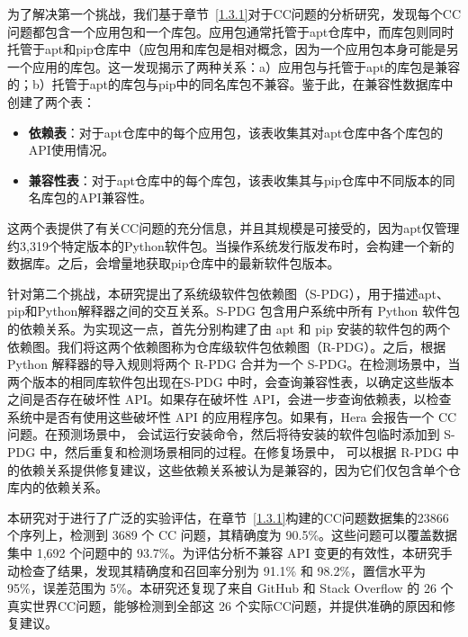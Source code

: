 为了解决第一个挑战，我们基于章节~\ref{1.3.1}对于CC问题的分析研究，发现每个CC问题都包含一个应用包和一个库包。应用包通常托管于apt仓库中，而库包则同时托管于apt和pip仓库中（应包用和库包是相对概念，因为一个应用包本身可能是另一个应用的库包。这一发现揭示了两种关系：a）应用包与托管于apt的库包是兼容的；b）托管于apt的库包与pip中的同名库包不兼容。鉴于此，\tool{}在兼容性数据库中创建了两个表：
\begin{itemize}
	\item \textbf{依赖表}：对于apt仓库中的每个应用包，该表收集其对apt仓库中各个库包的API使用情况。
	\item\textbf{兼容性表}：对于apt仓库中的每个库包，该表收集其与pip仓库中不同版本的同名库包的API兼容性。
\end{itemize}
这两个表提供了有关CC问题的充分信息，并且其规模是可接受的，因为apt仅管理约3,319个特定版本的Python软件包。当操作系统发行版发布时，\tool{}会构建一个新的数据库。之后，\tool{}会增量地获取pip仓库中的最新软件包版本。

针对第二个挑战，本研究提出了系统级软件包依赖图（S-PDG），用于描述apt、pip和Python解释器之间的交互关系。S-PDG 包含用户系统中所有 Python 软件包的依赖关系。为实现这一点，\tool{}首先分别构建了由 apt 和 pip 安装的软件包的两个依赖图。我们将这两个依赖图称为仓库级软件包依赖图（R-PDG）。之后，\tool{}根据 Python 解释器的导入规则将两个 R-PDG 合并为一个 S-PDG。在检测场景中，当两个版本的相同库软件包出现在S-PDG 中时，\tool{}会查询兼容性表，以确定这些版本之间是否存在破坏性 API。如果存在破坏性 API，\tool{}会进一步查询依赖表，以检查系统中是否有使用这些破坏性 API 的应用程序包。如果有，Hera 会报告一个 CC 问题。在预测场景中，\tool{} 会试运行安装命令，然后将待安装的软件包临时添加到 S-PDG 中，然后重复和检测场景相同的过程。在修复场景中，\tool{} 可以根据 R-PDG 中的依赖关系提供修复建议，这些依赖关系被认为是兼容的，因为它们仅包含单个仓库内的依赖关系。

本研究对于\tool{}进行了广泛的实验评估，在章节~\ref{1.3.1}构建的CC问题数据集的23866个序列上，\tool{}检测到 3689 个 CC 问题，其精确度为 90.5\%。这些问题可以覆盖数据集中 1,692 个问题中的 93.7\%。为评估分析不兼容 API 变更的有效性，本研究手动检查了结果，发现其精确度和召回率分别为 91.1\% 和 98.2\%，置信水平为 95\%，误差范围为 5\%。本研究还复现了来自 GitHub 和 Stack Overflow 的 26 个真实世界CC问题，\tool{}能够检测到全部这 26 个实际CC问题，并提供准确的原因和修复建议。
